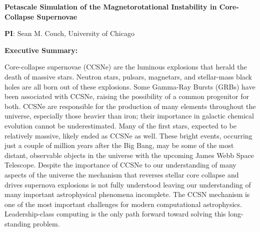 \documentclass[12pt,letterpaper]{article}
\newcommand{\doctitle}{Petascale Simulation of the Magnetorotational
  Instability in Core-Collapse Supernovae}
\begin{document}
\setlength{\parindent}{0in}

\pagestyle{fancy} 
\renewcommand{\headrulewidth}{0.0pt}

\begin{center} \textbf{\doctitle{}} \\
\end{center}

\begin{flushleft}
\textbf{PI}:
Sean M. Couch, University of Chicago \\
\medskip

\textbf{Executive Summary:} 

{\parindent 16pt

  Core-collapse supernovae (CCSNe) are the luminous explosions that
  herald the death of massive stars.  Neutron stars, pulsars,
  magnetars, and stellar-mass black holes are all born out of these
  explosions.  Some Gamma-Ray Bursts (GRBs) have been associated with
  CCSNe, raising the possibility of a common progenitor for both.
  CCSNe are responsible for the production of many elements throughout
  the universe, especially those heavier than iron; their importance
  in galactic chemical evolution cannot be underestimated.  Many of
  the first stars, expected to be relatively massive, likely ended as
  CCSNe as well.  These bright events, occurring just a couple of
  million years after the Big Bang, may be some of the most distant,
  observable objects in the universe with the upcoming James Webb
  Space Telescope.  Despite the importance of CCSNe to our
  understanding of many aspects of the universe the mechanism that
  reverses stellar core collapse and drives supernova explosions is
  not fully understood leaving our understanding of many important
  astrophysical phenomena incomplete.  The CCSN mechanism is one of
  the most important challenges for modern computational astrophysics.
  Leadership-class computing is the only path forward toward solving
  this long-standing problem.

}
\end{flushleft}
\end{document}
